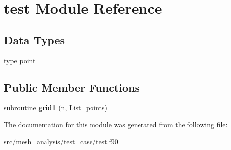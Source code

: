 \hypertarget{classtest}{\section{test Module Reference}
\label{classtest}
}
\subsection*{Data Types}
\begin{DoxyCompactItemize}
\item 
type \hyperlink{structtest_1_1point}{point}
\end{DoxyCompactItemize}
\subsection*{Public Member Functions}
\begin{DoxyCompactItemize}
\item 
\hypertarget{classtest_abef89d90acec73c3a75aafcd3ad517ba}{subroutine {\bfseries grid1} (n, List\-\_\-points)}\label{classtest_abef89d90acec73c3a75aafcd3ad517ba}

\end{DoxyCompactItemize}


The documentation for this module was generated from the following file\-:\begin{DoxyCompactItemize}
\item 
src/mesh\-\_\-analysis/test\-\_\-case/test.\-f90\end{DoxyCompactItemize}
